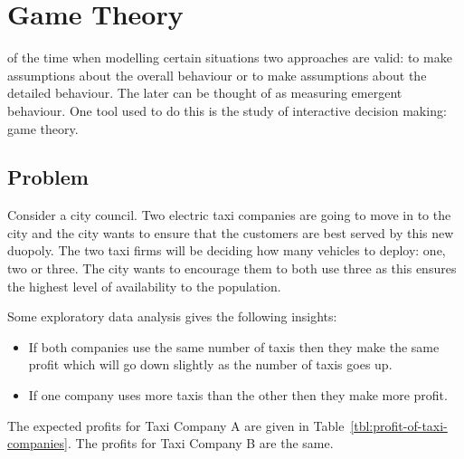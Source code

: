 \chapter[Game Theory]{Game Theory}

 of the time when modelling certain situations two
approaches are valid: to make assumptions about the overall behaviour or to make
assumptions about the detailed behaviour. The later can be thought of as
measuring emergent behaviour. One tool used to do this is the study of
interactive  decision making: game theory.

\section{Problem}\label{sec:problem}

Consider a city council. Two electric taxi companies are going to move in to
the city and the city wants to ensure that the customers are best served by this
new duopoly. The two taxi firms will be deciding how many vehicles to deploy:
one, two or three. The city wants to encourage them to both use three as this
ensures the highest level of availability to the population.

Some exploratory data analysis gives the following insights:

\begin{itemize}
    \item If both companies use the same number of taxis then they make the same
        profit which will go down slightly as the number of taxis goes up.
    \item If one company uses more taxis than the other then they make more
        profit.
\end{itemize}

The expected profits for Taxi Company A are given in Table~\ref{tbl:profit-of-taxi-companies}.
The profits for Taxi Company B are the same.

